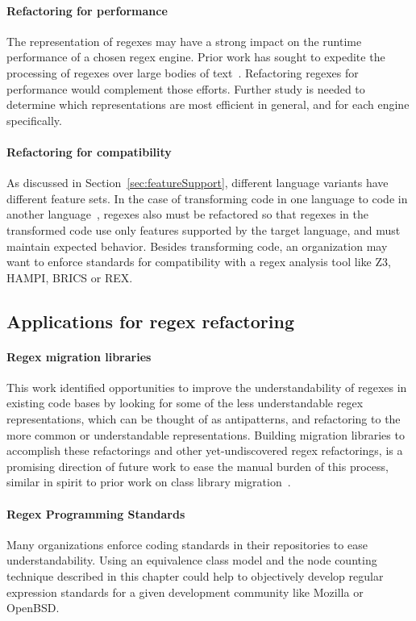 \paragraph{Refactoring for performance}  The representation of regexes may have a strong impact on the runtime performance of a chosen regex engine. Prior work has sought to expedite the processing of regexes over large bodies of text~.  Refactoring regexes for performance would complement those efforts.  Further study is needed to determine which representations are most efficient in general, and for each engine specifically.

\paragraph{Refactoring for compatibility}  As discussed in Section~\ref{sec:featureSupport}, different language variants have different feature sets.  In the case of transforming code in one language to code in another language~, regexes also must be refactored so that regexes in the transformed code use only features supported by the target language, and must maintain expected behavior.  Besides transforming code, an organization may want to enforce standards for compatibility with a regex analysis tool like Z3, HAMPI, BRICS or REX.

\subsection{Applications for regex refactoring}

\paragraph{Regex migration libraries}
This work identified opportunities to improve the understandability of regexes in existing code bases by looking for some of the less understandable regex representations, which can be thought of as antipatterns, and refactoring to the more common or understandable representations.  Building migration libraries to accomplish these refactorings and other yet-undiscovered regex refactorings, is a promising direction of future work to ease the manual burden of this process, similar in spirit to prior work on class library migration~.

\paragraph{Regex Programming Standards}
Many organizations enforce coding standards in their repositories to ease understandability.  Using an equivalence class model and the node counting technique described in this chapter could help to objectively develop regular expression standards for a given development community like Mozilla or OpenBSD.
